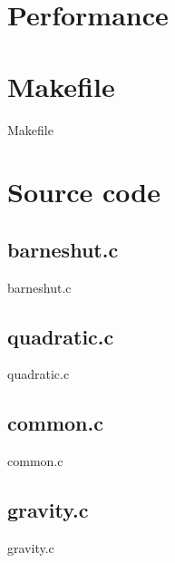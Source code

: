 \documentclass[a4paper, 11pt]{article}
\newcommand\cfile{}
\newcommand\makefile{Makefile}
\begin{document}
\section{Performance}

\appendix

\section{Makefile}
\makefile{}

\section{Source code}
\subsection{barneshut.c}
\cfile{barneshut.c}

\subsection{quadratic.c}
\cfile{quadratic.c}

\subsection{common.c}
\cfile{common.c}

\subsection{gravity.c}
\cfile{gravity.c}
\end{document}
